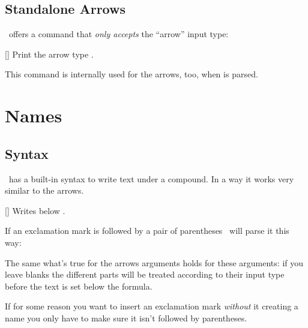 \documentclass[load-preamble+]{cnltx-doc}
\begin{document}
\begin{example}
  \texttt{\ShowChemArrow{->}} \par
  \texttt{\ShowChemArrow{->}} \par
\end{example}

\subsection{Standalone Arrows}
\chemformula\ offers a command that \emph{only accepts} the
\enquote{arrow} input type:
\begin{commands}
  []
    Print the arrow type .
\end{commands}
This command is internally used for the arrows, too, when  is parsed.

\section{Names}
\subsection{Syntax}
\chemformula\ has a built-in syntax to write text under a compound.  In a way
it works very similar to the arrows.
\begin{commands}
  []
    Writes  below .
\end{commands}
If an exclamation mark is followed by a pair of parentheses \chemformula\ will
parse it this way:
\begin{example}
\end{example}
The same what's true for the arrows arguments holds for these arguments: if
you leave blanks the different parts will be treated according to their input
type before the text is set below the formula.
\begin{example}
   \quad
   \quad
   \quad
   \quad
\end{example}
If for some reason you want to insert an exclamation mark \emph{without} it
creating a name you only have to make sure it isn't followed by parentheses.
\begin{example}
   \par
\end{example}
\end{document}
